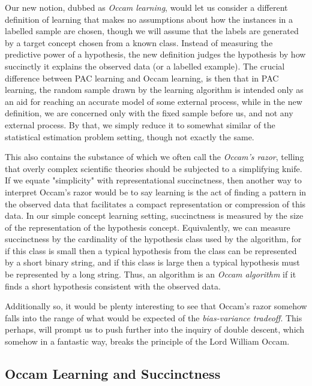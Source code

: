 Our new notion, dubbed as \textit{Occam learning}, would let us consider a different definition of learning that makes no assumptions about how the instances in a labelled sample are chosen, though we will assume that the labels are generated by a target concept chosen from a known class. Instead of measuring the predictive power of a hypothesis, the new definition judges the hypothesis by how succinctly it explains the observed data (or a labelled example). The crucial difference between PAC learning and Occam learning, is then that in PAC learning, the random sample drawn by the learning algorithm is intended only as an aid for reaching an accurate model of some external process, while in the new definition, we are concerned only with the fixed sample before us, and not any external process. By that, we simply reduce it to somewhat similar of the statistical estimation problem setting, though not exactly the same. 

This also contains the substance of which we often call the \textit{Occam's razor}, telling that overly complex scientific theories should be subjected to a simplifying knife. If we equate "simplicity" with representational succinctness, then another way to interpret Occam's razor would be to say learning is the act of finding a pattern in the observed data that facilitates a compact representation or compression of this data. In our simple concept learning setting, succinctness is measured by the size of the representation of the hypothesis concept. Equivalently, we can measure succinctness by the cardinality of the hypothesis class used by the algorithm, for if this class is small then a typical hypothesis from the class can be represented by a short binary string, and if this class is large then a typical hypothesis must be represented by a long string. Thus, an algorithm is an \textit{Occam algorithm} if it finds a short hypothesis consistent with the observed data. 

Additionally so, it would be plenty interesting to see that Occam's razor somehow falls into the range of what would be expected of the \textit{bias-variance tradeoff}. This perhaps, will prompt us to push further into the inquiry of double descent, which somehow in a fantastic way, breaks the principle of the Lord William Occam. 
\subsection{Occam Learning and Succinctness}

